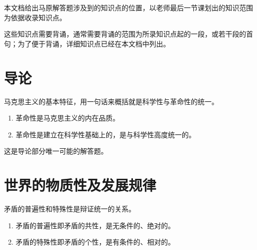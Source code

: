 \documentclass[UTF8]{ctexart}
\newcommand\Concept[1]{\colorbox{cyan!10!white}{\textcolor{cyan!40!black}{#1}}}
\newcommand\Notes[1]{\textcolor{yellow!50!black}{\small #1}}
\newcommand\Example[1]{\textcolor{cyan!70!black}{\small #1}}
\newcommand\pos[1]{\hspace{0pt} \marginpar{\footnotesize\textcolor{yellow!50!black}{\hfill #1}}}
\begin{document}
{\color{cyan!50!black}
本文档给出马原解答题涉及到的知识点的位置，以老师最后一节课划出的知识范围为依据收录知识点。

这些知识点需要背诵，通常需要背诵的范围为所录知识点起的一段，或若干段的首句；为了便于背诵，详细知识点已经在本文档中列出。
}

\setcounter{section}{-1}
\section{导\quad 论}
\begin{description}[itemsep=0pt,parsep=0pt]
    \item[\Concept{马克思主义的基本特征}] \pos{p15} 马克思主义的基本特征，用一句话来概括就是科学性与革命性的统一。
    \Example{\begin{enumerate}[itemsep=0pt, parsep=0pt, leftmargin=15pt]
            \item 革命性是马克思主义的内在品质。
            \item 革命性是建立在科学性基础上的，是与科学性高度统一的。
        \end{enumerate}}

    \Notes{这是导论部分唯一可能的解答题。}
\end{description}

\section{世界的物质性及发展规律}
\begin{description}[itemsep=0pt,parsep=0pt]
    \item[\Concept{矛盾普遍性与特殊性}] \pos{p47} 矛盾的普遍性和特殊性是辩证统一的关系。
    \Example{\begin{enumerate}[itemsep=0pt, parsep=0pt, leftmargin=15pt]
            \item 矛盾的普遍性即矛盾的共性，是无条件的、绝对的。
            \item 矛盾的特殊性即矛盾的个性，是有条件的、相对的。
        \end{enumerate}}
\end{description}
\end{document}
